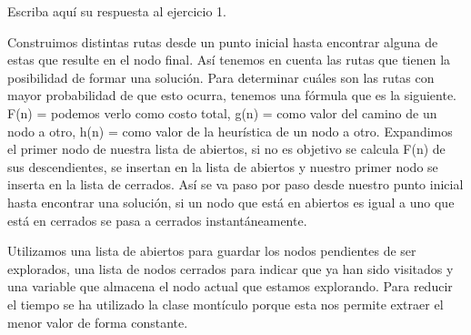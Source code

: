 Escriba aquí su respuesta al ejercicio 1.

Construimos distintas rutas desde un punto inicial hasta encontrar alguna de estas que resulte en el nodo final.
Así tenemos en cuenta las rutas que tienen la posibilidad de formar una solución. Para determinar cuáles son las rutas con mayor probabilidad de que esto ocurra, tenemos una fórmula que es la siguiente.
F(n) = podemos verlo como costo total, g(n) = como valor del camino de un nodo a otro, h(n) = como valor de la heurística de un nodo a otro.
Expandimos el primer nodo de nuestra lista de abiertos, si no es objetivo se calcula F(n) de sus descendientes, se insertan en la lista de abiertos y nuestro primer nodo se inserta en la lista de cerrados.
Así se va paso por paso desde nuestro punto inicial hasta encontrar una solución, si un nodo que está en abiertos es igual a uno que está en cerrados se pasa a cerrados instantáneamente.

Utilizamos una lista de abiertos para guardar los nodos pendientes de ser explorados, una lista de nodos cerrados para indicar que ya han sido visitados y una variable que almacena el nodo actual que estamos explorando.
Para reducir el tiempo se ha utilizado la clase montículo porque esta nos permite extraer el menor valor de forma constante.

